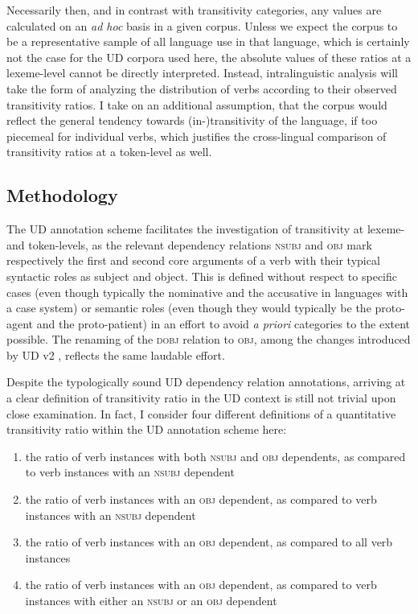 Necessarily then, and in contrast with transitivity categories, any values are calculated on an \textit{ad hoc} basis in a given corpus. Unless we expect the corpus to be a representative sample of all language use in that language, which is certainly not the case for the UD corpora used here, the absolute values of these ratios at a lexeme-level cannot be directly interpreted. Instead, intralinguistic analysis will take the form of analyzing the distribution of verbs according to their observed transitivity ratios. I take on an additional assumption, that the corpus would reflect the general tendency towards (in-)transitivity of the language, if too piecemeal for individual verbs, which justifies the cross-lingual comparison of transitivity ratios at a token-level as well.

\subsection{Methodology}

The UD annotation scheme facilitates the investigation of transitivity at lexeme- and token-levels, as the relevant dependency relations \textsc{nsubj} and \textsc{obj} mark respectively the first and second core arguments of a verb with their typical syntactic roles as subject and object. This is defined without respect to specific cases (even though typically the nominative and the accusative in languages with a case system) or semantic roles (even though they would typically be the proto-agent and the proto-patient) in an effort to avoid \textit{a priori} categories to the extent possible. The renaming of the \textsc{dobj} relation to \textsc{obj}, among the changes introduced by UD v2 \citep{nivre2020}, reflects the same laudable effort.

Despite the typologically sound UD dependency relation annotations, arriving at a clear definition of transitivity ratio in the UD context is still not trivial upon close examination. In fact, I consider four different definitions of a quantitative transitivity ratio within the UD annotation scheme here:

\begin{enumerate}
    \item the ratio of verb instances with both \textsc{nsubj} and \textsc{obj} dependents, as compared to verb instances with an \textsc{nsubj} dependent
    \item the ratio of verb instances with an \textsc{obj} dependent, as compared to verb instances with an \textsc{nsubj} dependent
    \item the ratio of verb instances with an \textsc{obj} dependent, as compared to all verb instances
    \item the ratio of verb instances with an \textsc{obj} dependent, as compared to verb instances with either an \textsc{nsubj} or an \textsc{obj} dependent
\end{enumerate}

